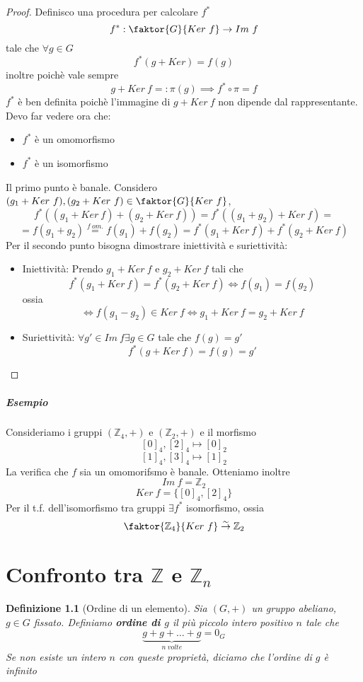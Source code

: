 \documentclass[a4paper]{report}
\newtheorem{definition}{Definizione}
\newcommand{\Z}{\ensuremath{\mathbb{Z}}}
\begin{document}
\begin{proof}
    Definisco una procedura per calcolare $f^*$
    \[
        f^*:\faktor{G}{Ker\ f}\rightarrow Im\ f
    \]
    tale che $\forall g\in G$
    \[
        f^*(g+Ker)=f(g)
    \]
    inoltre poichè vale sempre
    \[
        g+Ker\ f=:\pi(g)\implies f^*\circ\pi =f
    \]
    $f^*$ è ben definita poichè l'immagine di $g+Ker\ f$ non dipende dal rappresentante.\\
    Devo far vedere ora che:
    \begin{itemize}
        \item $f^*$ è un omomorfismo
        \item $f^*$ è un isomorfismo
    \end{itemize}
    Il primo punto è banale. Considero $(g_1+Ker\ f),(g_2+Ker\ f)\in\faktor{G}{Ker\ f}$,
    \[
        f^*((g_1+Ker\ f)+(g_2+Ker\ f))=f^*((g_1+g_2)+Ker\ f)=
    \]
    \[
        =f(g_1+g_2)\overset{f\ om.}{=}f(g_1)+f(g_2)=f^*(g_1+Ker\ f)+f^*(g_2+Ker\ f)
    \]
    Per il secondo punto bisogna dimostrare iniettività e suriettività:
    \begin{itemize}
        \item Iniettività: Prendo $g_1+Ker\ f$ e $g_2+Ker\ f$ tali che
              \[
                  f^*(g_1+Ker\ f)=f^*(g_2+Ker\ f)\Leftrightarrow f(g_1)=f(g_2)
              \]
              ossia
              \[
                  \Leftrightarrow f(g_1-g_2)\in Ker\ f\Leftrightarrow g_1+Ker\ f=g_2+Ker\ f
              \]
        \item Suriettività: $\forall g'\in Im\ f\exists g\in G$ tale che $f(g)=g'$
              \[
                  f^*(g+Ker\ f)=f(g)=g'
              \]
    \end{itemize}
\end{proof}
\paragraph{Esempio}
Consideriamo i gruppi $(\Z_4,+)$ e $(\Z_2,+)$ e il morfismo
\[
    [0]_4,[2]_4\mapsto [0]_2
\]
\[
    [1]_4,[3]_4\mapsto [1]_2
\]
La verifica che $f$ sia un omomorifsmo è banale. Otteniamo inoltre
\[
    Im\ f=\Z_2
\]
\[
    Ker\ f=\{[0]_4,[2]_4\}
\]
Per il t.f. dell'isomorfismo tra gruppi $\exists f^*$ isomorfismo, ossia
\[
    \faktor{\Z_4}{Ker\ f}\overset{\sim}{\rightarrow}\Z_2
\]
\chapter{Confronto tra $\Z$ e $\Z_n$}
\begin{definition}[Ordine di un elemento]
    Sia $(G,+)$ un gruppo abeliano, $g\in G$ fissato. Definiamo \textbf{ordine di $g$} il più piccolo intero positivo $n$ tale che
    \[
        \underbrace{g+g+\dots+g}_{n\ volte}=0_G
    \]
    Se non esiste un intero $n$ con queste proprietà, diciamo che l'ordine di $g$ è infinito
\end{definition}
\end{document}
